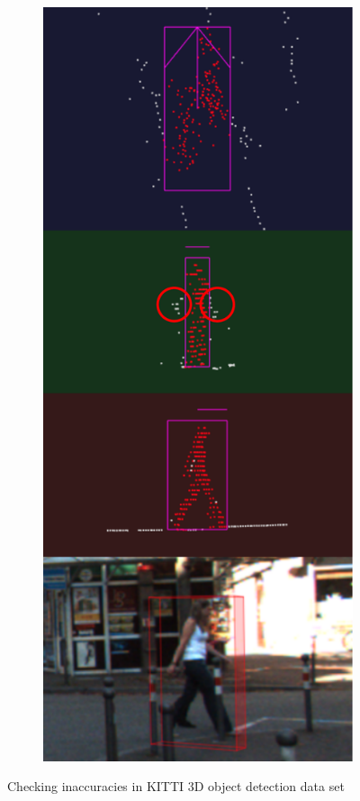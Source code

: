 \documentclass[letterpaper, 10 pt, conference]{ieeeconf}  %
\begin{document}
\begin{figure}
\begin{subfigure}{0.3\linewidth}
		\includegraphics[scale=0.2]{./figures/annocheck-2}
	\end{subfigure}
	
	\caption{Checking inaccuracies in KITTI 3D object detection data set}
	\label{fig:annocheck}
\end{figure}
\end{document}
